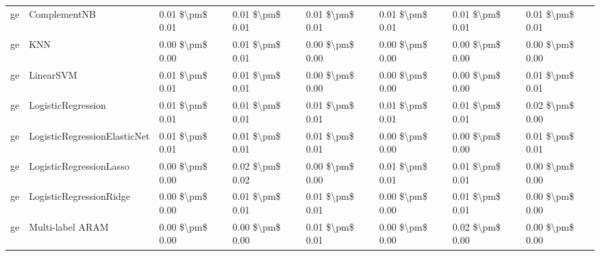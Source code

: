 \begin{tabular}{llllllll}
      ge &                    ComplementNB & 0.01 \$\textbackslash pm\$ 0.01 &           0.01 \$\textbackslash pm\$ 0.01 &       0.01 \$\textbackslash pm\$ 0.01 &        0.01 \$\textbackslash pm\$ 0.01 &                         0.01 \$\textbackslash pm\$ 0.01 &     0.01 \$\textbackslash pm\$ 0.01 \\
      ge &                             KNN & 0.00 \$\textbackslash pm\$ 0.00 &           0.01 \$\textbackslash pm\$ 0.01 &       0.00 \$\textbackslash pm\$ 0.00 &        0.00 \$\textbackslash pm\$ 0.00 &                         0.00 \$\textbackslash pm\$ 0.00 &     0.00 \$\textbackslash pm\$ 0.00 \\
      ge &                       LinearSVM & 0.01 \$\textbackslash pm\$ 0.01 &           0.01 \$\textbackslash pm\$ 0.01 &       0.00 \$\textbackslash pm\$ 0.00 &        0.00 \$\textbackslash pm\$ 0.00 &                         0.00 \$\textbackslash pm\$ 0.00 &     0.01 \$\textbackslash pm\$ 0.01 \\
      ge &              LogisticRegression & 0.01 \$\textbackslash pm\$ 0.01 &           0.01 \$\textbackslash pm\$ 0.01 &       0.01 \$\textbackslash pm\$ 0.01 &        0.01 \$\textbackslash pm\$ 0.01 &                         0.01 \$\textbackslash pm\$ 0.01 &     0.02 \$\textbackslash pm\$ 0.00 \\
      ge &    LogisticRegressionElasticNet & 0.01 \$\textbackslash pm\$ 0.01 &           0.01 \$\textbackslash pm\$ 0.01 &       0.01 \$\textbackslash pm\$ 0.01 &        0.00 \$\textbackslash pm\$ 0.00 &                         0.00 \$\textbackslash pm\$ 0.00 &     0.01 \$\textbackslash pm\$ 0.01 \\
      ge &         LogisticRegressionLasso & 0.00 \$\textbackslash pm\$ 0.00 &           0.02 \$\textbackslash pm\$ 0.02 &       0.00 \$\textbackslash pm\$ 0.00 &        0.01 \$\textbackslash pm\$ 0.01 &                         0.01 \$\textbackslash pm\$ 0.01 &     0.00 \$\textbackslash pm\$ 0.00 \\
      ge &         LogisticRegressionRidge & 0.00 \$\textbackslash pm\$ 0.00 &           0.01 \$\textbackslash pm\$ 0.01 &       0.01 \$\textbackslash pm\$ 0.01 &        0.00 \$\textbackslash pm\$ 0.00 &                         0.01 \$\textbackslash pm\$ 0.01 &     0.00 \$\textbackslash pm\$ 0.00 \\
      ge &                Multi-label ARAM & 0.00 \$\textbackslash pm\$ 0.00 &           0.00 \$\textbackslash pm\$ 0.00 &       0.01 \$\textbackslash pm\$ 0.01 &        0.00 \$\textbackslash pm\$ 0.00 &                         0.02 \$\textbackslash pm\$ 0.00 &     0.00 \$\textbackslash pm\$ 0.00 \\

\end{tabular}

